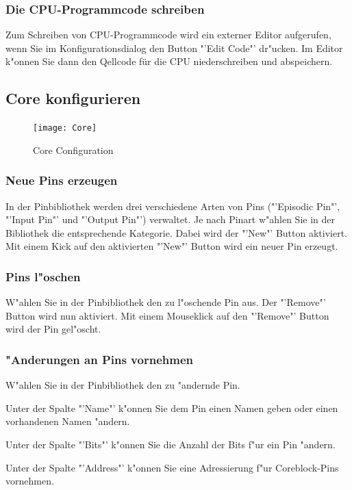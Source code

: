 \documentclass[a4paper,titlepage,12pt,ngerman]{scrbook}
\begin{document}
\subsubsection{Die CPU-Programmcode schreiben}
Zum Schreiben von CPU-Programmcode wird ein externer Editor aufgerufen, wenn Sie im Konfigurationsdialog den Button "'Edit Code"' dr"ucken. Im Editor k"onnen Sie dann den Qellcode für die CPU niederschreiben und abspeichern.
 



\subsection{Core konfigurieren}
\begin{figure}[htbp]
\begin{center}
\texttt{[image: Core]}
\caption{Core Configuration}\label{test}
\end{center}
\end{figure}
\subsubsection{Neue Pins erzeugen}
In der Pinbibliothek werden drei verschiedene Arten von Pins ("'Episodic Pin"', "'Input Pin"' und "'Output Pin"') verwaltet. Je nach Pinart w"ahlen Sie in der Bibliothek die entsprechende Kategorie. Dabei wird der "'New"' Button aktiviert. Mit einem Kick auf den aktivierten "'New"' Button wird ein neuer Pin erzeugt. \par
\subsubsection{Pins l"oschen}
W"ahlen Sie in der Pinbibliothek den zu l"oschende Pin aus. Der "'Remove"' Button wird nun aktiviert. Mit einem Mouseklick auf den "'Remove"' Button wird der Pin gel"oscht.
\subsubsection{"Anderungen an Pins vornehmen}
W"ahlen Sie in der Pinbibliothek den zu "andernde Pin.\par
Unter der Spalte "'Name"' k"onnen Sie dem Pin einen Namen geben oder einen vorhandenen Namen "andern.\par
Unter der Spalte "'Bits"' k"onnen Sie die Anzahl der Bits f"ur ein Pin "andern.\par
Unter der Spalte "'Address"' k"onnen Sie eine Adressierung f"ur Coreblock-Pins vornehmen.\par
\end{document}
